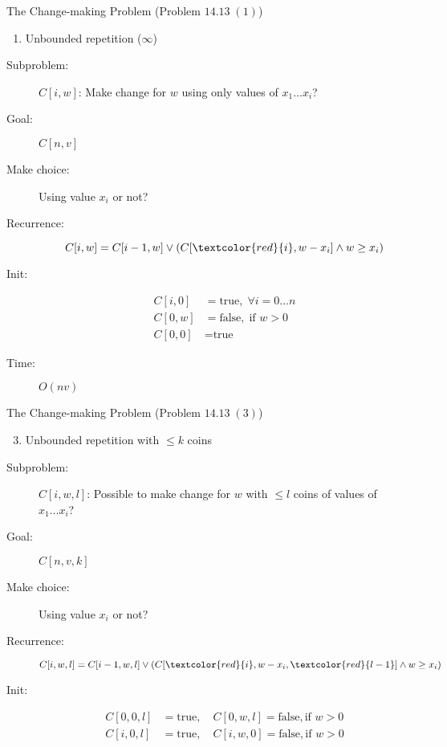 \begin{frame}{}
  \begin{exampleblock}{The Change-making Problem (Problem $14.13\; (1)$)}
    \begin{enumerate}[(1)]
      \item Unbounded repetition ($\infty$)
    \end{enumerate}
  \end{exampleblock}

  \pause
  \begin{description}
    \item[Subproblem:] $C[i, w]$: Make change for $w$ using only values of $x_{1} \dots x_{i}$?
    \item[Goal:] $C[n,v]$
      \pause
    \item[Make choice:] Using value $x_{i}$ or not?
    \item[Recurrence:] 
      \[
	C[i,w] = C[i-1, w] \lor (C[\textcolor{red}{i}, w-x_{i}] \land w \ge x_{i})
      \]
      \pause
    \item[Init:]
      \begin{align*}
	C[i,0] &= \text{true}, \; \forall i = 0 \dots n  \\
	C[0,w] &= \text{false}, \; \text{if } w > 0 \\
	C[0,0] &= \text{true}
      \end{align*}
    \item[Time:] $O(nv)$
  \end{description}
\end{frame}
\begin{frame}{}
  \begin{exampleblock}{The Change-making Problem (Problem $14.13\; (3)$)}
    \begin{enumerate}[(1)]
      \setcounter{enumi}{2}
      \item Unbounded repetition with $\le k$ coins
    \end{enumerate}
  \end{exampleblock}

  \pause
  \begin{description}
	\item[Subproblem:] $C[i,w,l]$: Possible to make change for $w$ with $\le l$ coins of values of $x_{1} \dots x_{i}$?
	\item[Goal:] $C[n,v,k]$
	  \pause
	\item[Make choice:] Using value $x_{i}$ or not? 
	\item[Recurrence:] 
	  \[
		C[i,w,l] = C[i-1,w,l] \lor \left( C[\textcolor{red}{i}, w-x_{i}, \textcolor{red}{l-1}] \land w \ge x_{i} \right)
	  \]
	  \pause
	\item[Init:]
	  \begin{align*}
		C[0,0,l] &= \text{true}, \quad C[0,w,l] = \text{false}, \text{if } w > 0 \\
		C[i,0,l] &= \text{true}, \quad C[i,w,0] = \text{false}, \text{if } w > 0
	  \end{align*}
  \end{description}
\end{frame}
